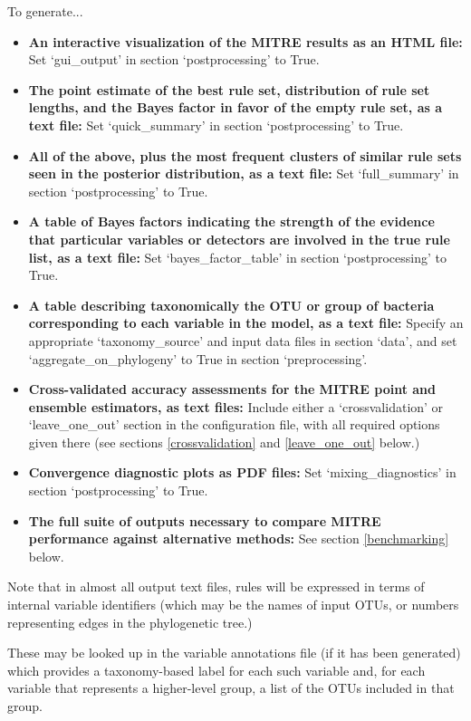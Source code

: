 \documentclass[12pt]{report}
\begin{document}
To generate...
\begin{itemize}
\item \textbf{An interactive visualization of the MITRE results as an
  HTML file:} Set `gui\_output' in section `postprocessing' to True.
\item \textbf{The point estimate of the best rule set, distribution of
  rule set lengths, and the Bayes factor in favor of the empty rule
  set, as a text file:} Set `quick\_summary' in section
  `postprocessing' to True.
\item \textbf{All of the above, plus the most frequent clusters of
  similar rule sets seen in the posterior distribution, as a text
  file:} Set `full\_summary' in section `postprocessing' to True.
\item \textbf{A table of Bayes factors indicating the strength of the
  evidence that particular variables or detectors are involved in the
  true rule list, as a text file:} Set `bayes\_factor\_table' in
  section `postprocessing' to True.
\item \textbf{A table describing taxonomically the OTU or group of
  bacteria corresponding to each variable in the model, as a text
  file:} Specify an appropriate `taxonomy\_source' and input data
  files in section `data', and set `aggregate\_on\_phylogeny' to True
  in section `preprocessing'.
\item \textbf{Cross-validated accuracy assessments for the MITRE point
  and ensemble estimators, as text files:} Include either a `crossvalidation' or
  `leave\_one\_out' section in the configuration file, with all
  required options given there (see sections \ref{crossvalidation} and
  \ref{leave_one_out} below.)
\item \textbf{Convergence diagnostic plots as PDF files:} Set
  `mixing\_diagnostics' in section `postprocessing' to True.
\item \textbf{The full suite of outputs necessary to compare MITRE
  performance against alternative methods:} See section
  \ref{benchmarking} below.
\end{itemize}  

Note that in almost all output text files, rules will be expressed in
terms of internal variable identifiers (which may be the names of
input OTUs, or numbers representing edges in the phylogenetic tree.)

These may be looked up in the variable annotations file (if it has
been generated) which provides a taxonomy-based label for each such
variable and, for each variable that represents a higher-level group,
a list of the OTUs included in that group.
\end{document}
